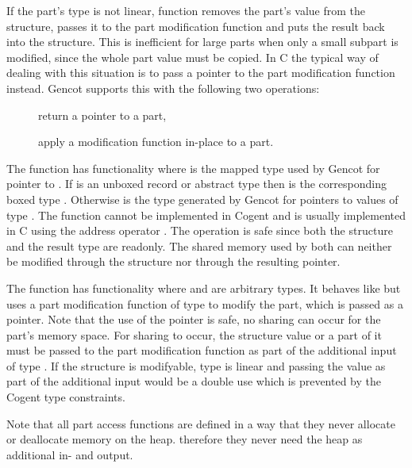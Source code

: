 If the part's type  is not linear, function  removes the part's value from the structure,
passes it to the part modification function and puts the result back into the structure. This is
inefficient for large parts when only a small subpart is modified, since the whole part value must be copied.
In C the typical way of dealing with this situation is to pass a pointer to the part modification function 
instead. Gencot supports this with the following two operations:
\begin{description}
  \item[] return a pointer to a part,
  \item[] apply a modification function in-place to a part.
\end{description}

The function  has functionality  where  is the mapped type used by Gencot
for pointer to . If  is an unboxed record or abstract type  then  is the
corresponding boxed type . Otherwise  is the type  generated by Gencot for pointers
to values of type . The function cannot be implemented in Cogent and is usually implemented in C using the address 
operator \code{\&}. The operation is safe since both the structure and the result type are readonly. The shared
memory used by both can neither be modified through the structure nor through the resulting pointer. 

The function  has functionality  where  and  are
arbitrary types. It behaves like  but uses a part modification function of
type  to modify the part, which is passed as a pointer.
Note that the use of the pointer is safe, no sharing can occur for the part's memory
space. For sharing to occur, the structure value or a part of it must be passed to the part modification function as
part of the additional input of type . If the structure is modifyable, type  is linear and passing 
the value as part of the additional input would be a double use which is prevented by the Cogent type constraints.

Note that all part access functions are defined in a way that they never allocate or deallocate memory on the heap.
therefore they never need the heap as additional in- and output.

